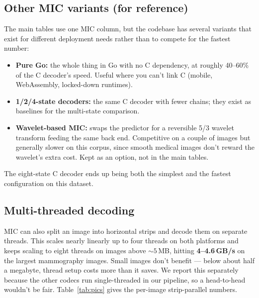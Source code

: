 \documentclass[11pt]{article}
\begin{document}
\subsection{Other MIC variants (for reference)}

The main tables use one MIC column, but the codebase has several variants
that exist for different deployment needs rather than to compete for the
fastest number:

\begin{itemize}
  \item \textbf{Pure Go:} the whole thing in Go with no C dependency, at
  roughly 40--60\% of the C decoder's speed. Useful where you can't link C
  (mobile, WebAssembly, locked-down runtimes).
  \item \textbf{1/2/4-state decoders:} the same C decoder with fewer chains;
  they exist as baselines for the multi-state comparison.
  \item \textbf{Wavelet-based MIC:} swaps the predictor for a reversible 5/3
  wavelet transform feeding the same back end. Competitive on a couple of
  images but generally slower on this corpus, since smooth medical images
  don't reward the wavelet's extra cost. Kept as an option, not in the main
  tables.
\end{itemize}

The eight-state C decoder ends up being both the simplest and the fastest
configuration on this dataset.

\subsection{Multi-threaded decoding}

MIC can also split an image into horizontal strips and decode them on
separate threads. This scales nearly linearly up to four threads on both
platforms and keeps scaling to eight threads on images above ${\sim}5$\,MB,
hitting \textbf{4--4.6\,GB/s} on the largest mammography images. Small images
don't benefit --- below about half a megabyte, thread setup costs more than it
saves. We report this separately because the other codecs run single-threaded
in our pipeline, so a head-to-head wouldn't be fair.
Table~\ref{tab:pics} gives the per-image strip-parallel numbers.
\end{document}
